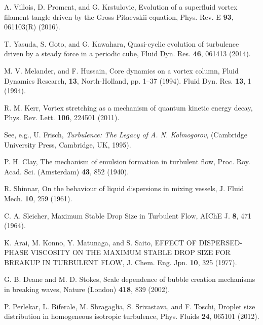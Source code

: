 \documentclass[12pt,a4paper]{jbook}
\begin{document}
\begin{thebibliography}{99}
		A. Villois, D. Proment, and G. Krstulovic,
		Evolution of a superfluid vortex filament tangle driven
		by the Gross-Pitaevskii equation,
		Phys. Rev. E \textbf{93}, 061103(R) (2016).

		T. Yasuda, S. Goto, and G. Kawahara,
		Quasi-cyclic evolution of turbulence driven by a steady force in a periodic cube,
		Fluid Dyn. Res. \textbf{46}, 061413 (2014).

		M. V. Melander, and F. Hussain,
		Core dynamics on a vortex column,
		Fluid Dynamics Research, \textbf{13}, North-Holland, pp. 1--37 (1994).
		Fluid Dyn. Res. \textbf{13}, 1 (1994).

		R. M. Kerr,
		Vortex stretching as a mechanism of quantum kinetic energy decay,
		Phys. Rev. Lett. \textbf{106}, 224501 (2011).


        See, e.g., U. Frisch, {\it Turbulence: The Legacy of A. N. Kolmogorov},
        (Cambridge University Press, Cambridge, UK, 1995).

        P. H. Clay,
        The mechanism of emulsion formation in turbulent flow,
        Proc. Roy. Acad. Sci. (Amsterdam) \textbf{43}, 852 (1940).    

        R. Shinnar,
        On the behaviour of liquid dispersions in mixing vessels,
        J. Fluid Mech. \textbf{10}, 259 (1961).

        C. A. Sleicher,
        Maximum Stable Drop Size in Turbulent Flow,
        AIChE J. \textbf{8}, 471 (1964).

        K. Arai, M. Konno, Y. Matunaga, and S. Saito,
        EFFECT OF DISPERSED-PHASE VISCOSITY ON THE MAXIMUM STABLE DROP SIZE FOR
        BREAKUP IN TURBULENT FLOW,
        J. Chem. Eng. Jpn. \textbf{10}, 325 (1977).

        G. B. Deane and M. D. Stokes, 
        Scale dependence of bubble creation mechanisms in breaking waves,
        Nature (London) \textbf{418}, 839 (2002).

        P. Perlekar, L. Biferale, M. Sbragaglia, S. Srivastava, and F. Toschi,
        Droplet size distribution in homogeneous isotropic turbulence,
        Phys. Fluids \textbf{24}, 065101 (2012).


\end{thebibliography}
\end{document}
